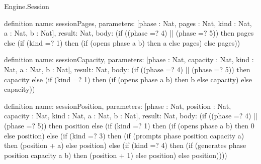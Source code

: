 \begin{lexlean}{Engine.Session}
\begin{semanticmodule}
definition{
  name: sessionPages,
  parameters: [phase : Nat, pages : Nat, kind : Nat, a : Nat, b : Nat],
  result: Nat,
  body: (if ((phase =? 4) || (phase =? 5)) then pages else (if (kind =? 1) then (if (opens phase a b) then a else pages) else pages))
}

definition{
  name: sessionCapacity,
  parameters: [phase : Nat, capacity : Nat, kind : Nat, a : Nat, b : Nat],
  result: Nat,
  body: (if ((phase =? 4) || (phase =? 5)) then capacity else (if (kind =? 1) then (if (opens phase a b) then b else capacity) else capacity))
}

definition{
  name: sessionPosition,
  parameters: [phase : Nat, position : Nat, capacity : Nat, kind : Nat, a : Nat, b : Nat],
  result: Nat,
  body: (if ((phase =? 4) || (phase =? 5)) then position else (if (kind =? 1) then (if (opens phase a b) then 0 else position) else (if (kind =? 3) then (if (prompts phase position capacity a) then (position + a) else position) else (if (kind =? 4) then (if (generates phase position capacity a b) then (position + 1) else position) else position))))
}
\end{semanticmodule}
\end{lexlean}
